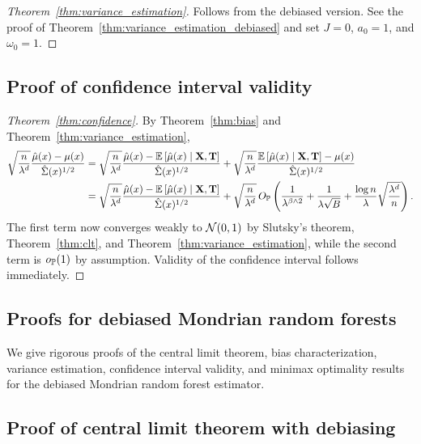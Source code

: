 \begin{proof}[Theorem~\ref{thm:variance_estimation}]
  Follows from the debiased version.
  See the proof of Theorem~\ref{thm:variance_estimation_debiased}
  and set $J=0$,
  $a_0 = 1$, and $\omega_0 = 1$.
\end{proof}

\subsection*{Proof of confidence interval validity}

\begin{proof}[Theorem~\ref{thm:confidence}]
  By Theorem~\ref{thm:bias}
  and Theorem~\ref{thm:variance_estimation},
  \begin{align*}
    \sqrt{\frac{n}{\lambda^d}}
    \frac{\hat \mu(x) - \mu(x)}{\hat \Sigma(x)^{1/2}}
    &=
    \sqrt{\frac{n}{\lambda^d}}
    \frac{\hat \mu(x) - \E \left[ \hat \mu(x) \mid \bX, \bT \right]}
    {\hat \Sigma(x)^{1/2}}
    + \sqrt{\frac{n}{\lambda^d}}
    \frac{\E \left[ \hat \mu(x) \mid \bX, \bT \right] - \mu(x)}
    {\hat \Sigma(x)^{1/2}} \\
    &=
    \sqrt{\frac{n}{\lambda^d}}
    \frac{\hat \mu(x) - \E \left[ \hat \mu(x) \mid \bX, \bT \right]}
    {\hat \Sigma(x)^{1/2}}
    + \sqrt{\frac{n}{\lambda^d}} \,
    O_\P \left(
      \frac{1}{\lambda^{\beta \wedge 2}}
      + \frac{1}{\lambda \sqrt B}
      + \frac{\log n}{\lambda} \sqrt{\frac{\lambda^d}{n}}
    \right).
  \end{align*}
  The first term now converges weakly to $\cN(0,1)$ by
  Slutsky's theorem, Theorem~\ref{thm:clt},
  and Theorem~\ref{thm:variance_estimation},
  while the second term is $o_\P(1)$ by assumption.
  Validity of the confidence interval follows immediately.
\end{proof}

\subsection{Proofs for debiased Mondrian random forests}

We give rigorous proofs of the central limit theorem,
bias characterization, variance estimation,
confidence interval validity, and minimax optimality
results for the debiased Mondrian random forest estimator.

\subsection*{Proof of central limit theorem with debiasing}

